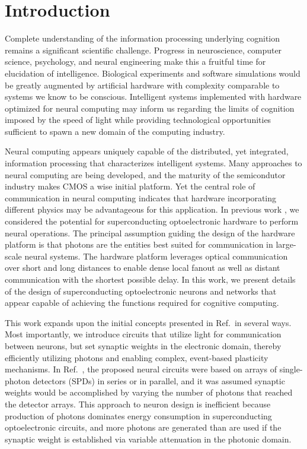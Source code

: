 \documentclass[twocolumn]{article}
\newcommand{\onlinecite}[1]{\hspace{-1 ex} \nocite{#1}\citenum{#1}}
\begin{document}

\section{\label{sec:introduction}Introduction}
Complete understanding of the information processing underlying cognition remains a significant scientific challenge. Progress in neuroscience, computer science, psychology, and neural engineering make this a fruitful time for elucidation of intelligence. Biological experiments and software simulations would be greatly augmented by artificial hardware with complexity comparable to systems we know to be conscious. Intelligent systems implemented with hardware optimized for neural computing may inform us regarding the limits of cognition imposed by the speed of light while providing technological opportunities sufficient to spawn a new domain of the computing industry.

Neural computing appears uniquely capable of the distributed, yet integrated, information processing that characterizes intelligent systems. Many approaches to neural computing are being developed, and the maturity of the semicondutor industry makes CMOS a wise initial platform. Yet the central role of communication in neural computing indicates that hardware incorporating different physics may be advantageous for this application. In previous work \cite{shbu2017}, we considered the potential for superconducting optoelectronic hardware to perform neural operations. The principal assumption guiding the design of the hardware platform is that photons are the entities best suited for communication in large-scale neural systems. The hardware platform leverages optical communication over short and long distances to enable dense local fanout as well as distant communication with the shortest possible delay. In this work, we present details of the design of superconducting optoelectronic neurons and networks that appear capable of achieving the functions required for cognitive computing. 

This work expands upon the initial concepts presented in Ref.\,\onlinecite{shbu2017} in several ways. Most importantly, we introduce circuits that utilize light for communication between neurons, but set synaptic weights in the electronic domain, thereby efficiently utilizing photons and enabling complex, event-based plasticity mechanisms. In Ref.\,\onlinecite{shbu2017}, the proposed neural circuits were based on arrays of single-photon detectors (SPDs) in series or in parallel, and it was assumed synaptic weights would be accomplished by varying the number of photons that reached the detector arrays. This approach to neuron design is inefficient because production of photons dominates energy consumption in superconducting optoelectronic circuits, and more photons are generated than are used if the synaptic weight is established via variable attenuation in the photonic domain. 
\end{document}

